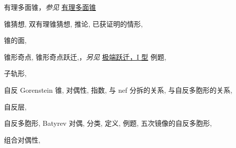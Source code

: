 \begin{theindex}
\subitem \leavevmode\hypertarget{idx:0156}{有理多面锥}，\textit{参见} \hyperlink{idx:1205}{有理多面锥}
\indexspace
\item \leavevmode\hypertarget{idx:0157}{锥猜想},\enspace{}
\subitem \leavevmode\hypertarget{idx:0158}{双有理锥猜想},\enspace{}
\subitem \leavevmode\hypertarget{idx:0159}{推论},\enspace{}
\subitem \leavevmode\hypertarget{idx:0160}{已获证明的情形},\enspace{}
\indexspace
\item \leavevmode\hypertarget{idx:0296}{锥的面},\enspace{}
\indexspace
\item \leavevmode\hypertarget{idx:0168}{锥形奇点},\enspace{}
\subitem \leavevmode\hypertarget{idx:0169}{锥形奇点跃迁},\enspace{}，\textit{另见} \hyperlink{idx:0292}{极端跃迁，I 型}
\subsubitem \leavevmode\hypertarget{idx:0170}{例题},\enspace{}
\indexspace
\item \leavevmode\hypertarget{idx:1290}{子轨形},\enspace{}
\indexspace
\item \leavevmode\hypertarget{idx:1213}{自反 Gorenstein 锥},\enspace{}
\subitem \leavevmode\hypertarget{idx:1214}{对偶性},\enspace{}
\subitem \leavevmode\hypertarget{idx:1215}{指数},\enspace{}
\subitem \leavevmode\hypertarget{idx:1216}{与 nef 分拆的关系},\enspace{}
\subitem \leavevmode\hypertarget{idx:1217}{与自反多胞形的关系},\enspace{}
\indexspace
\item \leavevmode\hypertarget{idx:1224}{自反层},\enspace{}
\indexspace
\item \leavevmode\hypertarget{idx:1218}{自反多胞形},\enspace{}
\subitem \leavevmode\hypertarget{idx:1219}{Batyrev 对偶},\enspace{}
\subitem \leavevmode\hypertarget{idx:1220}{分类},\enspace{}
\subitem \leavevmode\hypertarget{idx:1221}{定义},\enspace{}
\subitem \leavevmode\hypertarget{idx:1222}{例题},\enspace{}
\subitem \leavevmode\hypertarget{idx:1223}{五次镜像的自反多胞形},\enspace{}
\indexspace
\item \leavevmode\hypertarget{idx:0130}{组合对偶性},\enspace{}

\end{theindex}
